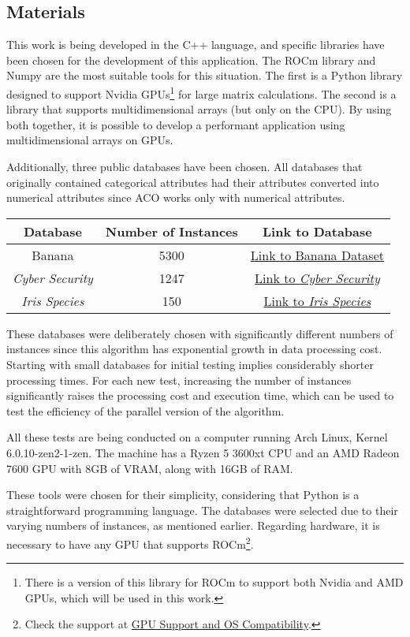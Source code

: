 \subsection{Materials} \label{Materials}

This work is being developed in the C++ language, and specific libraries have been chosen for the development of this application. The ROCm library\cite{cupyLib} and Numpy\cite{numpyLib} are the most suitable tools for this situation. The first is a Python library designed to support Nvidia GPUs\footnote[1]{There is a version of this library for ROCm to support both Nvidia and AMD GPUs, which will be used in this work.} for large matrix calculations. The second is a library that supports multidimensional arrays (but only on the CPU). By using both together, it is possible to develop a performant application using multidimensional arrays on GPUs.

Additionally, three public databases have been chosen. All databases that originally contained categorical attributes had their attributes converted into numerical attributes since ACO works only with numerical attributes.

\begin{center}
    \begin{tabular}{|c|c|c|}
        \hline
        Database & Number of Instances & Link to Database \\
        \hline
        Banana & 5300 & \href{https://www.kaggle.com/datasets/saranchandar/standard-classification-banana-dataset}{Link to Banana Dataset} \\
        \hline
        \emph{Cyber Security} & 1247 & \href{https://www.kaggle.com/datasets/deepcontractor/cyber-security-salaries}{Link to \emph{Cyber Security}} \\
        \hline
        \emph{Iris Species} & 150 & \href{https://www.kaggle.com/datasets/uciml/iris}{Link to \emph{Iris Species}} \\
        \hline
    \end{tabular}
\end{center}

These databases were deliberately chosen with significantly different numbers of instances since this algorithm has exponential growth in data processing cost. Starting with small databases for initial testing implies considerably shorter processing times. For each new test, increasing the number of instances significantly raises the processing cost and execution time, which can be used to test the efficiency of the parallel version of the algorithm.

All these tests are being conducted on a computer running Arch Linux, Kernel 6.0.10-zen2-1-zen. The machine has a Ryzen 5 3600xt CPU and an AMD Radeon 7600 GPU with 8GB of VRAM, along with 16GB of RAM.

These tools were chosen for their simplicity, considering that Python is a straightforward programming language. The databases were selected due to their varying numbers of instances, as mentioned earlier. Regarding hardware, it is necessary to have any GPU that supports ROCm\footnote[2]{Check the support at \href{https://rocm.docs.amd.com/en/latest/release/gpu_os_support.html}{GPU Support and OS Compatibility}.}.
